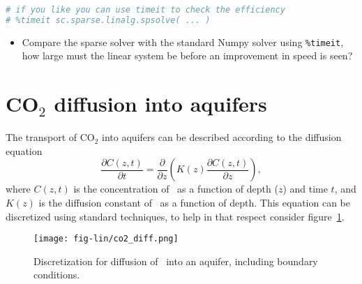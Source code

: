 \documentclass[graybox,sectrefs,envcountresetchap,open=right,final]{svmonodo}
\newenvironment{doconceexercise}{}{}
\begin{document}
\begin{doconceexercise}
\begin{lstlisting}[language=python,style=blue1bar]
# if you like you can use timeit to check the efficiency
# %timeit sc.sparse.linalg.spsolve( ... )

\end{lstlisting}


\begin{itemize}
\item Compare the sparse solver with the standard Numpy solver using \Verb!%
\end{itemize}

\noindent
\end{doconceexercise}

\section{CO$_2$ diffusion into aquifers}
The transport of CO$_2$ into aquifers can be described according to the diffusion equation
\begin{equation}
\frac{\partial C(z,t)}{\partial t}=\frac{\partial }{\partial z}\left(K(z)\frac{\partial C(z,t)}{\partial z}\right),
\label{eq:lin:co2_diff}
\end{equation}
where $C(z,t)$ is the concentration of \co\ as a function of depth ($z$) and time $t$, and $K(z)$ is the diffusion constant of \co\ as a function of depth. This equation can be discretized using standard techniques, to help in that respect consider figure~\ref{fig:lin:co2_diff}.

\begin{figure}[!ht]  %
  \centerline{\texttt{[image: fig-lin/co2\_diff.png]}}
  \caption{
  Discretization for diffusion of \co\ into an aquifer, including boundary conditions. \label{fig:lin:co2_diff}
  }
\end{figure}
\end{document}
